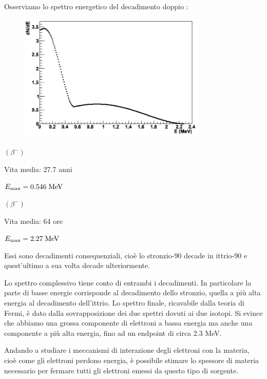 \begin{esempio}
    Osserviamo lo spettro energetico del decadimento doppio :

    \begin{minipage}{0.7\textwidth}
        \begin{figure}[H]
            \centering
            \includegraphics[width=9cm]{immagini/decadimento_beta_doppio.png}
        \end{figure}
    \end{minipage}
    \begin{minipage}{0.3\textwidth}

         $(\beta^-)$

        \vspace{0.2cm}Vita media: 27.7 anni

        \vspace{0.2cm}$E_{\rm max}=0.546 \; \rm MeV$

        \vspace{0.8cm} $(\beta^-)$

        \vspace{0.2cm}Vita media: 64 ore

        \vspace{0.2cm}$E_{\rm max}=2.27 \; \rm MeV$
    \end{minipage}

    \vspace{0.2cm}Essi sono decadimenti consequenziali, cioè lo stronzio-90 decade in ittrio-90 e quest'ultimo a sua volta decade ulteriormente.

    Lo spettro complessivo tiene conto di entrambi i decadimenti. In particolare la parte di basse energie corrisponde al decadimento dello stronzio, quella a più alta energia al decadimento dell'ittrio. Lo spettro finale, ricavabile dalla teoria di Fermi, è dato dalla sovrapposizione dei due spettri dovuti ai due isotopi. Si evince che abbiamo una grossa componente di elettroni a bassa energia ma anche una componente a più alta energia, fino ad un endpoint di circa 2.3 MeV.

    Andando a studiare i meccanismi di interazione degli elettroni con la materia, cioè come gli elettroni perdono energia, è possibile stimare lo spessore di materia necessario per fermare tutti gli elettroni emessi da questo tipo di sorgente.
\end{esempio}

